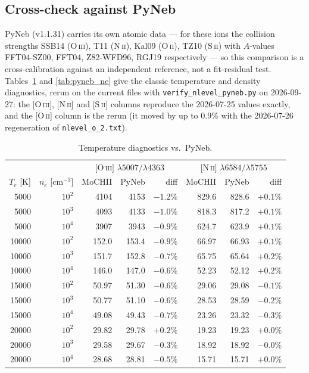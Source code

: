 \documentclass[english,a4paper]{my_memo}
\newcommand{\code}[1]{\texttt{#1}}
\begin{document}
\subsection{Cross-check against PyNeb}
PyNeb (v1.1.31) carries its own atomic data --- for these ions the
collision strengths SSB14 (O\,\textsc{iii}), T11 (N\,\textsc{ii}),
Kal09 (O\,\textsc{ii}), TZ10 (S\,\textsc{ii}) with $A$-values
FFT04-SZ00, FFT04, Z82-WFD96, RGJ19 respectively --- so this comparison is
a cross-calibration against an independent reference, not a fit-residual
test.  Tables~\ref{tab:pyneb_te} and \ref{tab:pyneb_ne} give the classic
temperature and density diagnostics, rerun on the current files with
\code{verify\_nlevel\_pyneb.py} on 2026-09-27: the [O\,\textsc{iii}],
[N\,\textsc{ii}] and [S\,\textsc{ii}] columns reproduce the 2026-07-25
values exactly, and the [O\,\textsc{ii}] column is the rerun (it moved by
up to 0.9\% with the 2026-07-26 regeneration of \code{nlevel\_o\_2.txt}).

\begin{table}[p]
\centering
\caption{Temperature diagnostics vs.\ PyNeb.}
\label{tab:pyneb_te}
\begin{tabular}{rr rrr rrr}
\hline
 & & \multicolumn{3}{c}{$[$O\,\textsc{iii}$]$ $\lambda5007/\lambda4363$}
   & \multicolumn{3}{c}{$[$N\,\textsc{ii}$]$ $\lambda6584/\lambda5755$} \\
$T_e$ [K] & $n_e$ [cm$^{-3}$] & MoCHII & PyNeb & diff
                              & MoCHII & PyNeb & diff \\
\hline
 5000 & $10^2$ & 4104  & 4153  & $-1.2\%$ & 829.6 & 828.6 & $+0.1\%$ \\
 5000 & $10^3$ & 4093  & 4133  & $-1.0\%$ & 818.3 & 817.2 & $+0.1\%$ \\
 5000 & $10^4$ & 3907  & 3943  & $-0.9\%$ & 624.7 & 623.9 & $+0.1\%$ \\
10000 & $10^2$ & 152.0 & 153.4 & $-0.9\%$ & 66.97 & 66.93 & $+0.1\%$ \\
10000 & $10^3$ & 151.7 & 152.8 & $-0.7\%$ & 65.75 & 65.64 & $+0.2\%$ \\
10000 & $10^4$ & 146.0 & 147.0 & $-0.6\%$ & 52.23 & 52.12 & $+0.2\%$ \\
15000 & $10^2$ & 50.97 & 51.30 & $-0.6\%$ & 29.06 & 29.08 & $-0.1\%$ \\
15000 & $10^3$ & 50.77 & 51.10 & $-0.6\%$ & 28.53 & 28.59 & $-0.2\%$ \\
15000 & $10^4$ & 49.08 & 49.43 & $-0.7\%$ & 23.26 & 23.32 & $-0.3\%$ \\
20000 & $10^2$ & 29.82 & 29.78 & $+0.2\%$ & 19.23 & 19.23 & $+0.0\%$ \\
20000 & $10^3$ & 29.58 & 29.67 & $-0.3\%$ & 18.92 & 18.92 & $-0.0\%$ \\
20000 & $10^4$ & 28.68 & 28.81 & $-0.5\%$ & 15.71 & 15.71 & $+0.0\%$ \\
\hline
\end{tabular}
\end{table}
\end{document}
